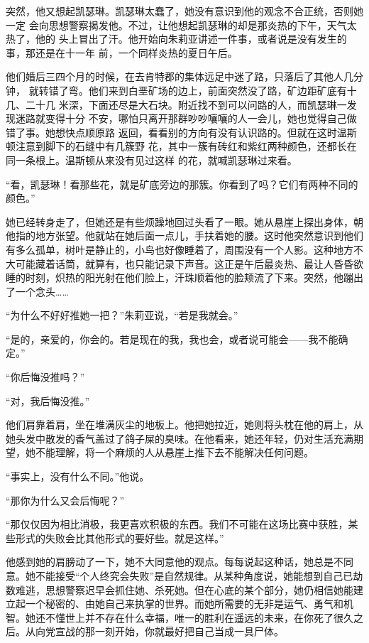突然，他又想起凯瑟琳。凯瑟琳太蠢了，她没有意识到他的观念不合正统，否则她一定
会向思想警察揭发他。不过，让他想起凯瑟琳的却是那炎热的下午，天气太热了，他的
头上冒出了汗。他开始向朱莉亚讲述一件事，或者说是没有发生的事，那还是在十一年
前，一个同样炎热的夏日午后。

他们婚后三四个月的时候，在去肯特郡的集体远足中迷了路，只落后了其他人几分钟，
就转错了弯。他们来到白垩矿场的边上，前面突然没了路，矿边距矿底有十几、二十几
米深，下面还尽是大石块。附近找不到可以问路的人，而凯瑟琳一发现迷路就变得十分
不安，哪怕只离开那群吵吵嚷嚷的人一会儿，她也觉得自己做错了事。她想快点顺原路
返回，看看别的方向有没有认识路的。但就在这时温斯顿注意到脚下的石缝中有几簇野
花，其中一簇有砖红和紫红两种颜色，还都长在同一条根上。温斯顿从来没有见过这样
的花，就喊凯瑟琳过来看。

``看，凯瑟琳！看那些花，就是矿底旁边的那簇。你看到了吗？它们有两种不同的颜色。''

她已经转身走了，但她还是有些烦躁地回过头看了一眼。她从悬崖上探出身体，朝他指的地方张望。他就站在她后面一点儿，手扶着她的腰。这时他突然意识到他们有多么孤单，树叶是静止的，小鸟也好像睡着了，周围没有一个人影。这种地方不大可能藏着话筒，就算有，也只能记录下声音。这正是午后最炎热、最让人昏昏欲睡的时刻，炽热的阳光射在他们脸上，汗珠顺着他的脸颊流了下来。突然，他蹦出了一个念头\ldots\ldots{}

``为什么不好好推她一把？''朱莉亚说，``若是我就会。''

``是的，亲爱的，你会的。若是现在的我，我也会，或者说可能会——我不能确定。''

``你后悔没推吗？''

``对，我后悔没推。''

他们肩靠着肩，坐在堆满灰尘的地板上。他把她拉近，她则将头枕在他的肩上，从她头发中散发的香气盖过了鸽子屎的臭味。在他看来，她还年轻，仍对生活充满期望，她不能理解，将一个麻烦的人从悬崖上推下去不能解决任何问题。

``事实上，没有什么不同。''他说。

``那你为什么又会后悔呢？''

``那仅仅因为相比消极，我更喜欢积极的东西。我们不可能在这场比赛中获胜，某些形式的失败会比其他形式的要好些。就是这样。''

他感到她的肩膀动了一下，她不大同意他的观点。每每说起这种话，她总是不同意。她不能接受``个人终究会失败''是自然规律。从某种角度说，她能想到自己已劫数难逃，思想警察迟早会抓住她、杀死她。但在心底的某个部分，她仍相信她能建立起一个秘密的、由她自己来执掌的世界。而她所需要的无非是运气、勇气和机智。她还不懂世上并不存在什么幸福，唯一的胜利在遥远的未来，在你死了很久之后。从向党宣战的那一刻开始，你就最好把自己当成一具尸体。

